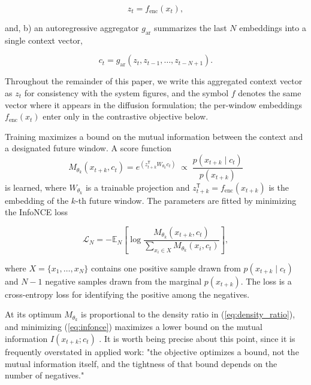 \documentclass[lettersize,journal]{IEEEtran}
\begin{document}
\begin{equation}
z_t = f_{\mathrm{enc}}(x_t),
\end{equation}

and, b) an autoregressive aggregator $g_{\mathrm{ar}}$ summarizes the last
$N$ embeddings into a single context vector,

\begin{equation}
c_t = g_{\mathrm{ar}}(z_t, z_{t-1}, \ldots, z_{t-N+1}).
\end{equation}

Throughout the remainder of this paper, we write this aggregated context
vector as $z_t$ for consistency with the system figures, and the symbol
$f$ denotes the same vector where it appears in the diffusion
formulation; the per-window embeddings $f_{\mathrm{enc}}(x_t)$ enter only
in the contrastive objective below.

Training maximizes a bound on the mutual information between the context
and a designated future window. A score function
\begin{equation}
M_{\theta_k}(x_{t+k}, c_t)
 = e^{\left(z_{t+k}^{\mathsf{T}} W_{\theta_k} c_t\right)}
 \;\propto\; \frac{p(x_{t+k} \mid c_t)}{p(x_{t+k})}
\label{eq:density_ratio}
\end{equation}
is learned, where $W_{\theta_k}$ is a trainable projection and
$z_{t+k}^{\mathsf{T}} = f_{\mathrm{enc}}(x_{t+k})$ is the embedding of
the $k$-th future window. The parameters are fitted by minimizing the
InfoNCE loss

\begin{equation}
\mathcal{L}_N = -\mathbb{E}_N\!\left[
\log \frac{M_{\theta_k}(x_{t+k}, c_t)}
{\sum_{x_i \in X} M_{\theta_k}(x_i, c_t)}\right],
\label{eq:infonce}
\end{equation}

where $X = \{x_1, \ldots, x_N\}$ contains one positive sample drawn from
$p(x_{t+k} \mid c_t)$ and $N-1$ negative samples drawn from the marginal
$p(x_{t+k})$.
The loss is a cross-entropy loss for identifying the positive
among the negatives.

At its optimum $M_{\theta_k}$ is proportional to the
density ratio in (\ref{eq:density_ratio}), and minimizing
(\ref{eq:infonce}) maximizes a lower bound on the mutual information
$I(x_{t+k}; c_t)$ \cite{Oord2018}.
It is worth being precise about this point, since it is frequently 
overstated in applied work: "the objective
optimizes a bound, not the mutual information itself, and the tightness
of that bound depends on the number of negatives."
\end{document}
